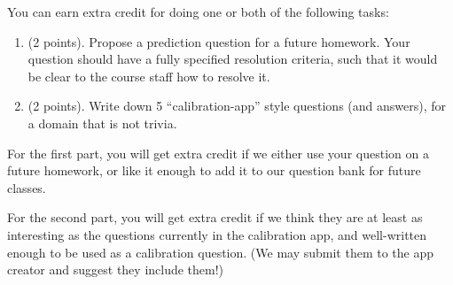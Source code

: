 \documentclass[11pt]{article}
\begin{document}
You can earn extra credit for doing one or both of the following tasks:
\begin{enumerate}
\item (2 points). Propose a prediction question for a future homework. Your question should have a fully specified resolution criteria, 
      such that it would be clear to the course staff how to resolve it.
\item (2 points). Write down 5 ``calibration-app'' style questions (and answers), for a domain that is not trivia.
\end{enumerate}

For the first part, you will get extra credit if we either use your question on a future homework, 
or like it enough to add it to our question bank for future classes.

For the second part, you will get extra credit if we think they are at least as interesting as the 
questions currently in the calibration app, and well-written enough to be used as a calibration question. 
(We may submit them to the app creator and suggest they include them!)
\end{document}

